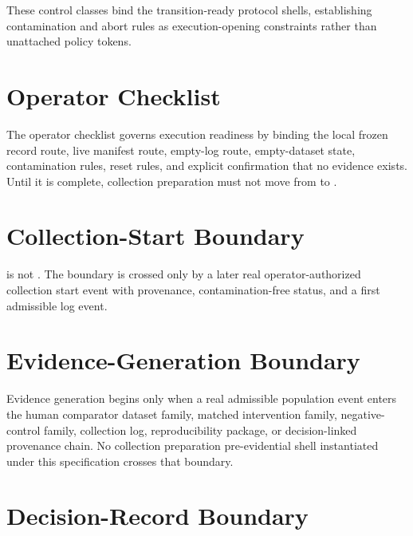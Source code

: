 \documentclass[11pt,a4paper]{article}
\begin{document}
These control classes bind the transition-ready protocol shells, establishing
contamination and abort rules as execution-opening constraints rather than
unattached policy tokens.

\section{Operator Checklist}

The operator checklist governs execution readiness by binding the local
frozen record route, live manifest route, empty-log route, empty-dataset
state, contamination rules, reset rules, and explicit confirmation that no
evidence exists. Until it is complete, collection preparation must not move from
\texttt{\allowbreak{}\allowbreak{}} to \texttt{\allowbreak{}\allowbreak{}\allowbreak{}\allowbreak{}}.

\section{Collection-Start Boundary}

\texttt{\allowbreak{}\allowbreak{}\allowbreak{}\allowbreak{}\allowbreak{}} is not \texttt{\allowbreak{}\allowbreak{}}.
The boundary is crossed only by a later real operator-authorized collection
start event with provenance, contamination-free status, and a first admissible
log event.

\section{Evidence-Generation Boundary}

Evidence generation begins only when a real admissible population event enters
the human comparator dataset family, matched intervention family,
negative-control family, collection log, reproducibility package, or
decision-linked provenance chain. No collection preparation pre-evidential shell instantiated under
this specification crosses that boundary.

\section{Decision-Record Boundary}
\end{document}
